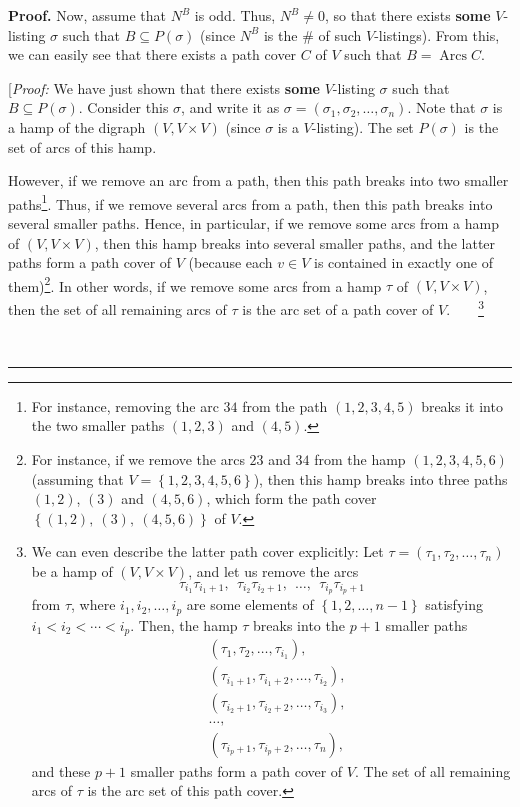 \documentclass[numbers=enddot,12pt,final,onecolumn,notitlepage]{scrartcl}%
\numberwithin{exer}{subsection}
\theoremstyle{definition}
\newenvironment{proof}[1][Proof]{\noindent\textbf{#1.} }{\ \rule{0.5em}{0.5em}}
\begin{document}
\begin{proof}
Now, assume that $N^{B}$ is odd. Thus, $N^{B}\neq0$, so that there exists
\textbf{some} $V$-listing $\sigma$ such that $B\subseteq P\left(
\sigma\right)  $ (since $N^{B}$ is the $\#$ of such $V$-listings). From this,
we can easily see that there exists a path cover $C$ of $V$ such that
$B=\operatorname*{Arcs}C$.

[\textit{Proof:} We have just shown that there exists \textbf{some}
$V$-listing $\sigma$ such that $B\subseteq P\left(  \sigma\right)  $. Consider
this $\sigma$, and write it as $\sigma=\left(  \sigma_{1},\sigma_{2}%
,\ldots,\sigma_{n}\right)  $. Note that $\sigma$ is a hamp of the digraph
$\left(  V,V\times V\right)  $ (since $\sigma$ is a $V$-listing). The set
$P\left(  \sigma\right)  $ is the set of arcs of this hamp.

However, if we remove an arc from a path, then this path breaks into two
smaller paths\footnote{For instance, removing the arc $34$ from the path
$\left(  1,2,3,4,5\right)  $ breaks it into the two smaller paths $\left(
1,2,3\right)  $ and $\left(  4,5\right)  $.}. Thus, if we remove several arcs
from a path, then this path breaks into several smaller paths. Hence, in
particular, if we remove some arcs from a hamp of $\left(  V,V\times V\right)
$, then this hamp breaks into several smaller paths, and the latter paths form
a path cover of $V$ (because each $v\in V$ is contained in exactly one of
them)\footnote{For instance, if we remove the arcs $23$ and $34$ from the hamp
$\left(  1,2,3,4,5,6\right)  $ (assuming that $V=\left\{  1,2,3,4,5,6\right\}
$), then this hamp breaks into three paths $\left(  1,2\right)  $, $\left(
3\right)  $ and $\left(  4,5,6\right)  $, which form the path cover $\left\{
\left(  1,2\right)  ,\ \left(  3\right)  ,\ \left(  4,5,6\right)  \right\}  $
of $V$.}. In other words, if we remove some arcs from a hamp $\tau$ of
$\left(  V,V\times V\right)  $, then the set of all remaining arcs of $\tau$
is the arc set of a path cover of $V$.\ \ \ \ \footnote{We can even describe
the latter path cover explicitly: Let $\tau=\left(  \tau_{1},\tau_{2}%
,\ldots,\tau_{n}\right)  $ be a hamp of $\left(  V,V\times V\right)  $, and
let us remove the arcs
\[
\tau_{i_{1}}\tau_{i_{1}+1},\ \ \tau_{i_{2}}\tau_{i_{2}+1},\ \ \ldots
,\ \ \tau_{i_{p}}\tau_{i_{p}+1}%
\]
from $\tau$, where $i_{1},i_{2},\ldots,i_{p}$ are some elements of $\left\{
1,2,\ldots,n-1\right\}  $ satisfying $i_{1}<i_{2}<\cdots<i_{p}$. Then, the
hamp $\tau$ breaks into the $p+1$ smaller paths%
\begin{align*}
&  \left(  \tau_{1},\tau_{2},\ldots,\tau_{i_{1}}\right)  ,\\
&  \left(  \tau_{i_{1}+1},\tau_{i_{1}+2},\ldots,\tau_{i_{2}}\right)  ,\\
&  \left(  \tau_{i_{2}+1},\tau_{i_{2}+2},\ldots,\tau_{i_{3}}\right)  ,\\
&  \ldots,\\
&  \left(  \tau_{i_{p}+1},\tau_{i_{p}+2},\ldots,\tau_{n}\right)  ,
\end{align*}
and these $p+1$ smaller paths form a path cover of $V$. The set of all
remaining arcs of $\tau$ is the arc set of this path cover.}


\end{proof}
\end{document}

